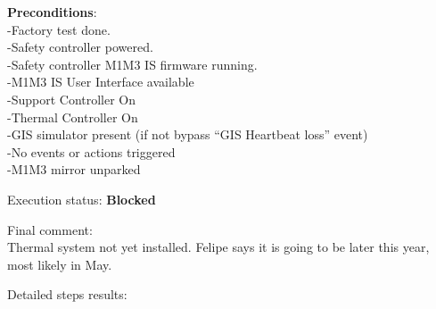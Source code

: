 \documentclass[SE,lsstdraft,STR,toc]{lsstdoc}
\begin{document}
\textbf{ Preconditions}:\\
-Factory test done.\\
-Safety controller powered.\\
-Safety controller M1M3 IS firmware running.\\
-M1M3 IS User Interface available\\
-Support Controller On\\
-Thermal Controller On\\
-GIS simulator present (if not bypass ``GIS Heartbeat loss'' event)\\
-No events or actions triggered\\
-M1M3 mirror unparked

Execution status: {\bf Blocked }

Final comment:\\Thermal system not yet installed. Felipe says it is going to be later
this year, most likely in May.


Detailed steps results:
\end{document}
